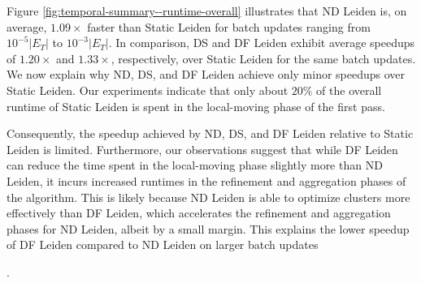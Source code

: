 Figure \ref{fig:temporal-summary--runtime-overall} illustrates that ND Leiden is, on average, $1.09\times$ faster than Static Leiden for batch updates ranging from $10^{-5}|E_T|$ to $10^{-3}|E_T|$. In comparison, DS and DF Leiden exhibit average speedups of $1.20\times$ and $1.33\times$, respectively, over Static Leiden for the same batch updates. We now explain why ND, DS, and DF Leiden achieve only minor speedups over Static Leiden. Our experiments indicate that only about $20\%$ of the overall runtime of Static Leiden is spent in the local-moving phase of the first pass. Consequently, the speedup achieved by ND, DS, and DF Leiden relative to Static Leiden is limited. Furthermore, our observations suggest that while DF Leiden can reduce the time spent in the local-moving phase slightly more than ND Leiden, it incurs increased runtimes in the refinement and aggregation phases of the algorithm. This is likely because ND Leiden is able to optimize clusters more effectively than DF Leiden, which accelerates the refinement and aggregation phases for ND Leiden, albeit by a small margin. This explains the lower speedup of DF Leiden compared to ND Leiden on larger batch updates.

